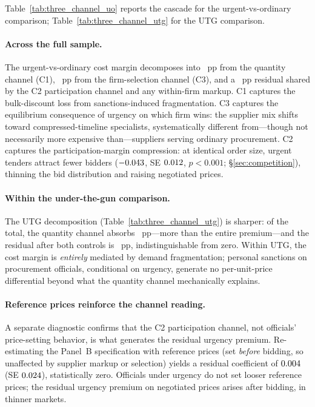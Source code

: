 Table~\ref{tab:three_channel_uo} reports the cascade for the urgent-vs-ordinary comparison; Table~\ref{tab:three_channel_utg} for the UTG comparison.


\paragraph{Across the full sample.} The \BPcascadeUOtotalPct{} urgent-vs-ordinary cost margin decomposes into \BPcascadeUOqtyPP~pp from the quantity channel (C1), \BPcascadeUOfirmPP~pp from the firm-selection channel (C3), and a \BPcascadeUOresidPP~pp residual shared by the C2 participation channel and any within-firm markup. C1 captures the bulk-discount loss from sanctions-induced fragmentation. C3 captures the equilibrium consequence of urgency on which firm wins: the supplier mix shifts toward compressed-timeline specialists, systematically different from---though not necessarily more expensive than---suppliers serving ordinary procurement. C2 captures the participation-margin compression: at identical order size, urgent tenders attract \BPfirmsPanelBpct{} fewer bidders ($-0.043$, SE $0.012$, $p<0.001$; \S\ref{sec:competition}), thinning the bid distribution and raising negotiated prices.

\paragraph{Within the under-the-gun comparison.} The UTG decomposition (Table~\ref{tab:three_channel_utg}) is sharper: of the \BPcascadeUTGtotalPct{} total, the quantity channel absorbs \BPcascadeUTGqtyPP~pp---more than the entire premium---and the residual after both controls is \BPcascadeUTGresidPP~pp, indistinguishable from zero. Within UTG, the cost margin is \emph{entirely} mediated by demand fragmentation; personal sanctions on procurement officials, conditional on urgency, generate no per-unit-price differential beyond what the quantity channel mechanically explains.

\paragraph{Reference prices reinforce the channel reading.} A separate diagnostic confirms that the C2 participation channel, not officials' price-setting behavior, is what generates the residual urgency premium. Re-estimating the Panel~B specification with reference prices (set \emph{before} bidding, so unaffected by supplier markup or selection) yields a residual coefficient of $0.004$ (SE $0.024$), statistically zero. Officials under urgency do not set looser reference prices; the residual urgency premium on negotiated prices arises after bidding, in thinner markets.

